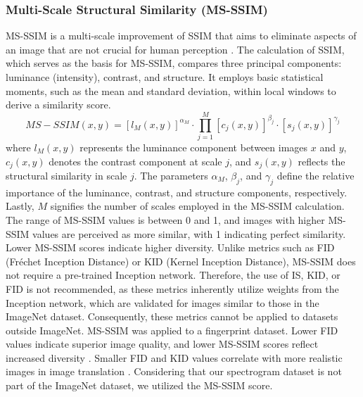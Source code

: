 \documentclass[journal]{IEEEtran}
\begin{document}
\subsubsection{Multi-Scale Structural Similarity (MS-SSIM)}
MS-SSIM is a multi-scale improvement of SSIM that aims to eliminate aspects of an image that are not crucial for human perception \cite{wang2003multiscale,ma2016group}. The calculation of SSIM, which serves as the basis for MS-SSIM, compares three principal components: luminance (intensity), contrast, and structure. It employs basic statistical moments, such as the mean and standard deviation, within local windows to derive a similarity score.
\begin{equation}
MS-SSIM(x,y)=\left[l_M (x,y)\right]^{\alpha_M}\cdot \prod_{j=1}^{M}\left[c_j(x,y)\right]^{\beta_j}\cdot \left[s_j (x,y)\right]^{\gamma_j}
\end{equation}
where $l_M (x,y)$ represents the luminance component between images $x$ and $y$, $c_j(x,y)$ denotes the contrast component at scale $j$, and $s_j(x,y)$ reflects the structural similarity in scale $j$. The parameters $\alpha_M$, $\beta_j$, and $\gamma_j$ define the relative importance of the luminance, contrast, and structure components, respectively. Lastly, $M$ signifies the number of scales employed in the MS-SSIM calculation\cite{arsenio2025recovering}.
The range of MS-SSIM values is between 0 and 1, and images with higher MS-SSIM values are perceived as more similar\cite{odena2017conditional}, with 1 indicating perfect similarity. Lower MS-SSIM scores indicate higher diversity\cite{guo2019autoembedding,wang2019improvingmmdgantrainingrepulsive}.
Unlike metrics such as FID (Fréchet Inception Distance) or KID (Kernel Inception Distance), MS-SSIM does not require a pre-trained Inception network\cite{fahim2020alightweight}. Therefore, the use of IS, KID, or FID is not recommended, as these metrics inherently utilize weights from the Inception network, which are validated for images similar to those in the ImageNet dataset. Consequently, these metrics cannot be applied to datasets outside ImageNet. MS-SSIM  was applied to a fingerprint dataset\cite{fahim2020alightweight}.
Lower FID values indicate superior image quality, and lower MS-SSIM scores reflect increased diversity \cite{guo2019autoembedding}. Smaller FID and KID values correlate with more realistic images in image translation \cite{torbunov2023rethinking}.
Considering that our spectrogram dataset is not part of the ImageNet dataset, we utilized the MS-SSIM score.
\end{document}
